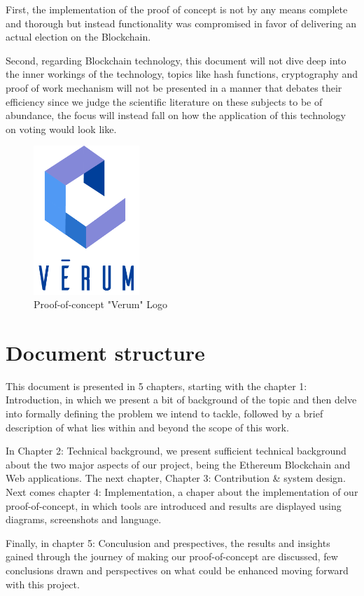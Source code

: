 First, the implementation of the proof of concept is not by any means complete and thorough but instead functionality was compromised in favor of delivering an actual election on the Blockchain.

Second, regarding Blockchain technology, this document will not dive deep into the inner workings of the technology, topics like hash functions, cryptography and proof of work mechanism will not be presented in a manner that debates their efficiency since we judge the scientific literature on these subjects to be of abundance, the focus will instead fall on how the application of this technology on voting would look like.

\begin{figure}[h]
	\centering
		\includegraphics[width=4cm]{images/chapter1/verum.png}
		\caption{{\footnotesize Proof-of-concept "Verum" Logo}}
\end{figure}\newpage

\section{Document structure}
This document is presented in 5 chapters, starting with the chapter 1: Introduction, in which we present a bit of background of the topic and then delve into formally defining the problem we intend to tackle, followed by a brief description of what lies within and beyond the scope of this work.

In Chapter 2: Technical background, we present sufficient technical background about the two major aspects of our project, being the Ethereum Blockchain and Web applications. The next chapter, Chapter 3: Contribution \& system design. Next comes chapter 4: Implementation, a chaper about the implementation of our proof-of-concept, in which tools are introduced and results are displayed using diagrams, screenshots and language.

Finally, in chapter 5: Conculusion and prespectives, the results and insights gained through the journey of making our proof-of-concept are discussed, few conclusions drawn and perspectives on what could be enhanced moving forward with this project.